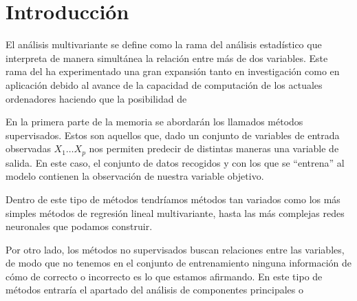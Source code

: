 \chapter*{Introducción}
El análisis multivariante se define como la rama del análisis estadístico que interpreta de manera simultánea la relación entre más de dos variables. Este rama del ha experimentado una gran expansión tanto en investigación como en aplicación debido al avance de la capacidad de computación de los actuales ordenadores haciendo que la posibilidad de  

En la primera parte de la memoria se abordarán los llamados métodos supervisados. Estos son aquellos que, dado un conjunto de variables de entrada observadas $X_1 \ldots X_p$ nos permiten predecir de distintas maneras una variable de salida. En este caso, el conjunto de datos recogidos y con los que se ``entrena'' al modelo contienen la observación de nuestra variable objetivo. 

\noindent Dentro de este tipo de métodos tendríamos métodos tan variados como los más simples métodos de regresión lineal multivariante, hasta las más complejas redes neuronales que podamos construir. 

Por otro lado, los métodos no supervisados buscan relaciones entre las variables, de modo que no tenemos en el conjunto de entrenamiento ninguna información de cómo de correcto o incorrecto es lo que estamos afirmando. En este tipo de métodos entraría el apartado del análisis de componentes principales o 


